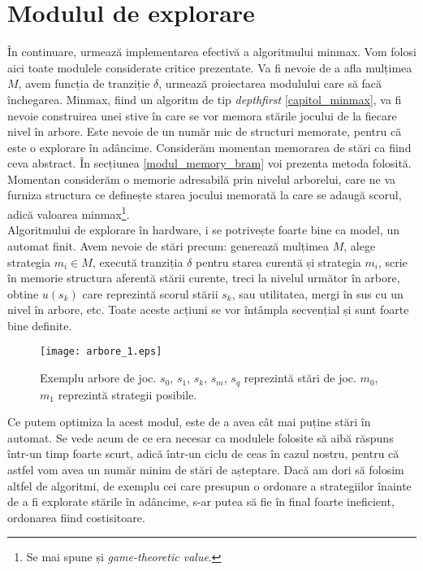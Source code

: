 \documentclass[12pt,twoside,a4paper,fleqn]{book}
\theoremstyle{definition}
\begin{document}
\section{Modulul de explorare}
\label{modul_game_ai}
În continuare, urmează implementarea efectivă a algoritmului minmax. Vom folosi aici toate modulele considerate critice prezentate. Va fi nevoie de a afla mulțimea $M$, avem funcția de tranziție $\delta$, urmează proiectarea modulului care să facă închegarea. Minmax, fiind un algoritm de tip \emph{depthfirst} \ref{capitol_minmax}, va fi nevoie construirea unei stive în care se vor memora stările jocului de la fiecare nivel în arbore. Este nevoie de un număr mic de structuri memorate, pentru că este o explorare în adâncime. Considerăm momentan memorarea de stări ca fiind ceva abstract. În secțiunea \ref{modul_memory_bram} voi prezenta metoda folosită. Momentan considerăm o memorie adresabilă prin nivelul arborelui, care ne va furniza structura ce definește starea jocului memorată la care se adaugă scorul, adică valoarea minmax\footnote{Se mai spune și \emph{game-theoretic value}.}.\\
Algoritmului de explorare în hardware, i se potrivește foarte bine ca model, un automat finit. Avem nevoie de stări precum: generează mulțimea $M$, alege strategia $m_{i} \in M$, execută tranziția $\delta$ pentru starea curentă și strategia $m_{i}$, scrie în memorie structura aferentă stării curente, treci la nivelul următor în arbore, obtine $u(s_{k})$ care reprezintă scorul stării $s_{k}$, sau utilitatea, mergi în sus cu un nivel în arbore, etc. Toate aceste acțiuni se vor întâmpla secvențial și sunt foarte bine definite.
\begin{figure}[h]
\texttt{[image: arbore\_1.eps]}
\caption{\small{Exemplu arbore de joc.
$s_{0}$, $s_{1}$, $s_{k}$, $s_{m}$, $s_{q}$ reprezintă stări de joc. $m_{0}$, $m_{1}$ reprezintă strategii posibile.}}
\label{fig:arbore_1}
\end{figure}
Ce putem optimiza la acest modul, este de a avea cât mai puține stări în automat. Se vede acum de ce era necesar ca modulele folosite să aibă răspuns într-un timp foarte scurt, adică într-un ciclu de ceas în cazul nostru, pentru că astfel vom avea un număr minim de stări de așteptare. Dacă am dori să folosim altfel de algoritmi, de exemplu cei care presupun o ordonare a strategiilor înainte de a fi explorate stările în adâncime, s-ar putea să fie în final foarte ineficient, ordonarea fiind costisitoare.
\end{document}

